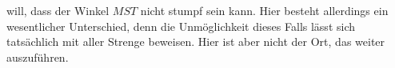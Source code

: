 %
will, dass der Winkel \(MST\) nicht stumpf sein kann. Hier besteht allerdings ein wesentlicher Unterschied, denn die Unmöglichkeit dieses Falls lässt sich tatsächlich mit aller Strenge beweisen. Hier ist aber nicht der Ort, das weiter auszuführen.

